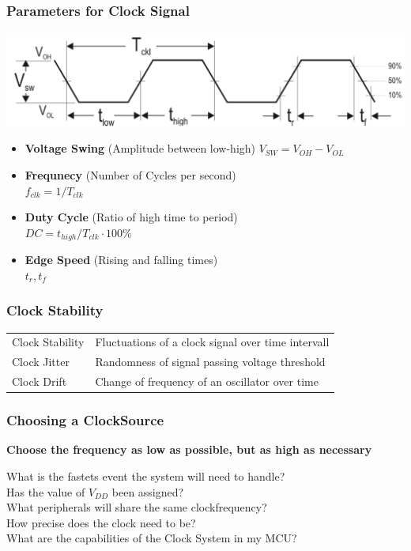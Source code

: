 \subsubsection{Parameters for Clock Signal }
\begin{minipage}{\linewidth}
    \centering
    \includegraphics[width=0.7\linewidth]{images/clock_parameters.png}
\end{minipage}
\begin{minipage}{\linewidth}
    \begin{multicols}{2}
	\begin{itemize}
		\item \textbf{Voltage Swing} (Amplitude between low-high) $V_{SW}=V_{OH}-V_{OL}$
		\item \textbf{Frequnecy} (Number of Cycles per second) \\$f_{clk}=1/T_{clk}$
		\item \textbf{Duty Cycle} (Ratio of high time to period)\\ $DC=t_{high}/T_{clk} \cdot 100 \%$
		\item \textbf{Edge Speed} (Rising and falling times)\\$t_r, t_f$
	\end{itemize}
\end{multicols}
\end{minipage}

\subsubsection{Clock Stability }
\begin{tabular}{ll}
	Clock Stability & Fluctuations of a clock signal over time intervall\\
	Clock Jitter & Randomness of signal passing voltage threshold\\
    Clock Drift & Change of frequency of an oscillator over time\\
\end{tabular}

\clearpage

\vspace{-0.5cm}
\subsubsection{Choosing a ClockSource }
    \begin{minipage}{15cm}
        \textbf{Choose the frequency as low as possible, but as high as necessary}
    \end{minipage}
What is the fastets event the system will need to handle?\\
Has the value of $ V_{DD} $ been assigned?\\
What peripherals will share the same clockfrequency?\\
How precise does the clock need to be?\\
What are the capabilities of the Clock System in my MCU?

